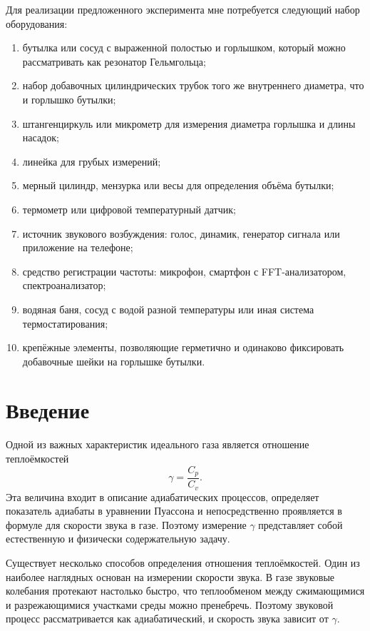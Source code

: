 \documentclass[a4paper,12pt]{article}
\begin{document}
	Для реализации предложенного эксперимента мне потребуется следующий набор оборудования:
	\begin{enumerate}[label=\arabic*)]
		\item бутылка или сосуд с выраженной полостью и горлышком, который можно рассматривать как резонатор Гельмгольца;
		\item набор добавочных цилиндрических трубок того же внутреннего диаметра, что и горлышко бутылки;
		\item штангенциркуль или микрометр для измерения диаметра горлышка и длины насадок;
		\item линейка для грубых измерений;
		\item мерный цилиндр, мензурка или весы для определения объёма бутылки;
		\item термометр или цифровой температурный датчик;
		\item источник звукового возбуждения: голос, динамик, генератор сигнала или приложение на телефоне;
		\item средство регистрации частоты: микрофон, смартфон с FFT-анализатором, спектроанализатор;
		\item водяная баня, сосуд с водой разной температуры или иная система термостатирования;
		\item крепёжные элементы, позволяющие герметично и одинаково фиксировать добавочные шейки на горлышке бутылки.
	\end{enumerate}
	
	\section{Введение}
	
	Одной из важных характеристик идеального газа является отношение теплоёмкостей
	\[
	\gamma=\frac{C_p}{C_v}.
	\]
	Эта величина входит в описание адиабатических процессов, определяет показатель адиабаты в уравнении Пуассона и непосредственно проявляется в формуле для скорости звука в газе. Поэтому измерение \(\gamma\) представляет собой естественную и физически содержательную задачу.
	
	Существует несколько способов определения отношения теплоёмкостей. Один из наиболее наглядных основан на измерении скорости звука. В газе звуковые колебания протекают настолько быстро, что теплообменом между сжимающимися и разрежающимися участками среды можно пренебречь. Поэтому звуковой процесс рассматривается как адиабатический, и скорость звука зависит от \(\gamma\).
	
\end{document}
